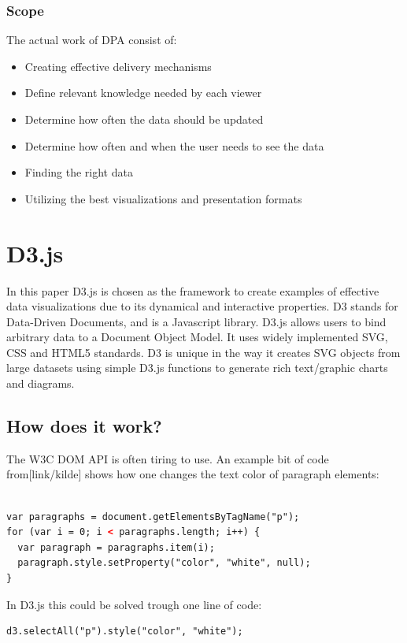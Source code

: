 \subsubsection{Scope}
The actual work of DPA consist of:
\begin{itemize}
\item Creating effective delivery mechanisms
\item Define relevant knowledge needed by each viewer
\item Determine how often the data should be updated
\item Determine how often and when the user needs to see the data
\item Finding the right data
\item Utilizing the best visualizations and presentation formats
\end{itemize}


\section{D3.js}
In this paper D3.js is chosen as the framework to create examples of effective data visualizations due to its dynamical and interactive properties. 
D3 stands for Data-Driven Documents, and is a Javascript library. 
D3.js allows users to bind arbitrary data to a Document Object Model. It uses widely implemented SVG, CSS and HTML5 standards. D3 is unique in the way it creates SVG objects from large datasets using simple D3.js functions to generate rich text/graphic charts and diagrams. 


\subsection{How does it work?}
The W3C DOM API is often tiring to use. An example bit of code from[link/kilde] shows how one changes the text color of paragraph elements:

\begin{lstlisting}[language=HTML]

var paragraphs = document.getElementsByTagName("p");
for (var i = 0; i < paragraphs.length; i++) {
  var paragraph = paragraphs.item(i);
  paragraph.style.setProperty("color", "white", null);
}

\end{lstlisting}

In D3.js this could be solved trough one line of code:

\begin{lstlisting}[language=HTML]
d3.selectAll("p").style("color", "white");
\end{lstlisting}

